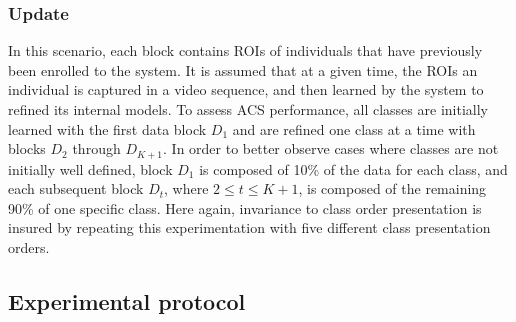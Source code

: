 \subsubsection{Update}

In this scenario, each block contains ROIs of individuals that have previously been enrolled to the system. It is assumed that at a given time, the ROIs an individual is captured in a video sequence, and then learned by the system to refined its internal models. To assess ACS performance, all classes are initially learned with the first data block $D_1$ and are refined one class at a time with blocks $D_2$ through $D_{K+1}$. In order to better observe cases where classes are not initially well defined, block $D_1$ is composed of 10\% of the data for each class, and each subsequent block $D_t$, where $2 \leq t \leq K+1$, is composed of the remaining 90\% of one specific class. Here again, invariance to class order presentation is insured by repeating this experimentation with five different class presentation orders.

\subsection{Experimental protocol}
\label{sec:c1_protocole}

